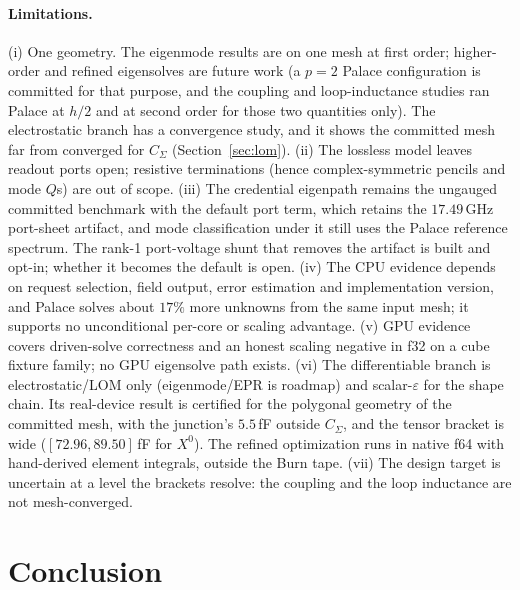 \documentclass{anvil-paper}
\begin{document}
\paragraph{Limitations.}
(i) One geometry. The eigenmode results are on one mesh at first order;
higher-order and refined eigensolves are future work (a $p = 2$ Palace
configuration is committed for that purpose, and the coupling and
loop-inductance studies ran Palace at $h/2$ and at second order for
those two quantities only). The electrostatic branch has a convergence
study, and it shows the committed mesh far from converged for
$C_\Sigma$ (Section~\ref{sec:lom}). (ii) The lossless model
leaves readout ports open; resistive terminations (hence
complex-symmetric pencils and mode $Q$s) are out of scope. (iii) The
credential eigenpath remains the ungauged committed benchmark with the
default port term, which retains the $17.49$\,GHz port-sheet artifact,
and mode classification under it still uses the Palace reference
spectrum. The rank-1 port-voltage shunt that removes the artifact is
built and opt-in; whether it becomes the default is open. (iv) The CPU evidence depends on
request selection, field output, error estimation and implementation
version, and Palace solves about $17\%$ more unknowns from the same
input mesh; it supports no unconditional per-core or scaling advantage.
(v) GPU evidence covers
driven-solve correctness and an honest scaling negative in f32 on a
cube fixture family; no GPU eigensolve path exists. (vi) The
differentiable branch is electrostatic/LOM only (eigenmode/EPR is
roadmap) and scalar-$\varepsilon$ for the shape chain. Its real-device
result is certified for the polygonal geometry of the committed mesh,
with the junction's $5.5$\,fF outside $C_\Sigma$, and the tensor bracket
is wide ($[72.96, 89.50]$\,fF for $X^0$). The refined optimization runs
in native f64 with hand-derived element integrals, outside the Burn
tape. (vii) The design target is uncertain at a level the brackets
resolve: the coupling and the loop inductance are not mesh-converged.

\section{Conclusion}
\label{sec:conclusion}
\end{document}
